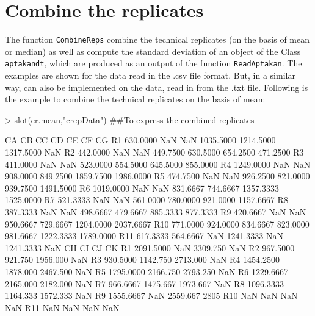\documentclass[11pt]{article}
\newcommand{\code}[1]{{\tt #1}}
\begin{document}
\section{Combine the replicates}
The function \code{CombineReps} combine the technical replicates (on the basis of mean or median) as
well as compute the standard deviation of an object of the Class \code{aptakandt}, which are produced
as an output of the function \code{ReadAptakan}. The examples are shown for the data read in the .csv
file format. But, in a similar way, can also be implemented on the data, read in from the .txt file.
Following is the example to combine the technical replicates on the basis of mean:

\begin{Schunk}
\end{Schunk}

\begin{Schunk}
\begin{Sinput}
> slot(cr.mean,"crepData")  ##To express the combined replicates
\end{Sinput}
\begin{Soutput}
           CA       CB       CC        CD        CE        CF        CG
R1   630.0000      NaN      NaN 1035.5000 1214.5000 1317.5000       NaN
R2   442.0000      NaN      NaN  449.7500  630.5000  654.2500  471.2500
R3   411.0000      NaN      NaN  523.0000  554.5000  645.5000  855.0000
R4  1249.0000      NaN      NaN  908.0000  849.2500 1859.7500 1986.0000
R5   474.7500      NaN      NaN  926.2500  821.0000  939.7500 1491.5000
R6  1019.0000      NaN      NaN  831.6667  744.6667 1357.3333 1525.0000
R7   521.3333      NaN      NaN  561.0000  780.0000  921.0000 1157.6667
R8   387.3333      NaN      NaN  498.6667  479.6667  885.3333  877.3333
R9   420.6667      NaN      NaN  950.6667  729.6667 1204.0000 2037.6667
R10  771.0000 924.0000 834.6667  823.0000  981.6667 1222.3333 1789.0000
R11  617.3333 564.6667      NaN 1241.3333       NaN 1241.3333       NaN
           CH       CI       CJ   CK
R1  2091.5000      NaN 3309.750  NaN
R2   967.5000  921.750 1956.000  NaN
R3   930.5000 1142.750 2713.000  NaN
R4  1454.2500 1878.000 2467.500  NaN
R5  1795.0000 2166.750 2793.250  NaN
R6  1229.6667 2165.000 2182.000  NaN
R7   966.6667 1475.667 1973.667  NaN
R8  1096.3333 1164.333 1572.333  NaN
R9  1555.6667      NaN 2559.667 2805
R10       NaN      NaN      NaN  NaN
R11       NaN      NaN      NaN  NaN
\end{Soutput}
\end{Schunk}
\end{document}
